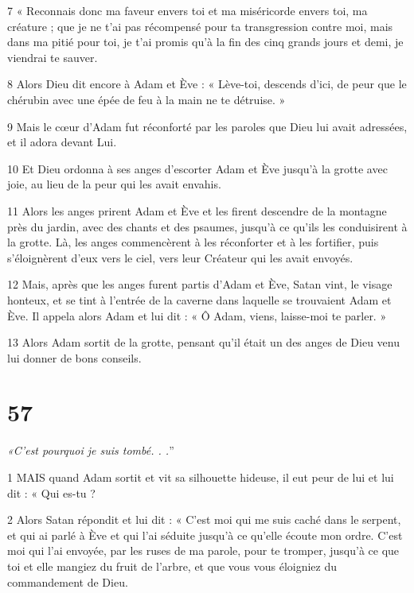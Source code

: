 \par 7 « Reconnais donc ma faveur envers toi et ma miséricorde envers toi, ma créature ; que je ne t'ai pas récompensé pour ta transgression contre moi, mais dans ma pitié pour toi, je t'ai promis qu'à la fin des cinq grands jours et demi, je viendrai te sauver.

\par 8 Alors Dieu dit encore à Adam et Ève : « Lève-toi, descends d'ici, de peur que le chérubin avec une épée de feu à la main ne te détruise. »

\par 9 Mais le cœur d'Adam fut réconforté par les paroles que Dieu lui avait adressées, et il adora devant Lui.

\par 10 Et Dieu ordonna à ses anges d'escorter Adam et Ève jusqu'à la grotte avec joie, au lieu de la peur qui les avait envahis.

\par 11 Alors les anges prirent Adam et Ève et les firent descendre de la montagne près du jardin, avec des chants et des psaumes, jusqu'à ce qu'ils les conduisirent à la grotte. Là, les anges commencèrent à les réconforter et à les fortifier, puis s'éloignèrent d'eux vers le ciel, vers leur Créateur qui les avait envoyés.

\par 12 Mais, après que les anges furent partis d'Adam et Ève, Satan vint, le visage honteux, et se tint à l'entrée de la caverne dans laquelle se trouvaient Adam et Ève. Il appela alors Adam et lui dit : « Ô Adam, viens, laisse-moi te parler. »

\par 13 Alors Adam sortit de la grotte, pensant qu'il était un des anges de Dieu venu lui donner de bons conseils.

\chapter{57}

\par \textit{«C'est pourquoi je suis tombé. . .}”

\par 1 MAIS quand Adam sortit et vit sa silhouette hideuse, il eut peur de lui et lui dit : « Qui es-tu ?

\par 2 Alors Satan répondit et lui dit : « C'est moi qui me suis caché dans le serpent, et qui ai parlé à Ève et qui l'ai séduite jusqu'à ce qu'elle écoute mon ordre. C'est moi qui l'ai envoyée, par les ruses de ma parole, pour te tromper, jusqu'à ce que toi et elle mangiez du fruit de l'arbre, et que vous vous éloigniez du commandement de Dieu.

